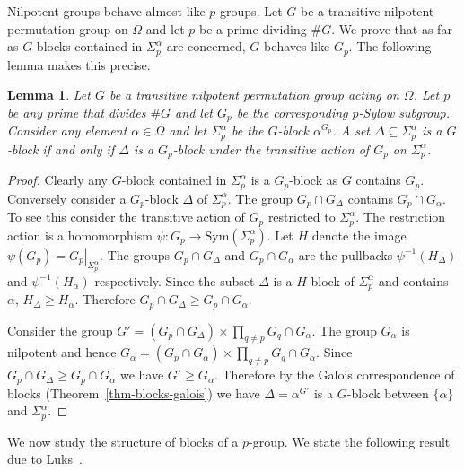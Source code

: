 \documentclass[11pt]{madras}%
\newtheorem{lemma}[theorem]{Lemma}
\theoremstyle{remark}
\newcommand{\Sym}[1]{{\ensuremath{\mathrm{Sym}\left(#1\right)}}}
\newcommand{\pr}[2]{{\ensuremath{\left.{#1}\right\vert_{#2}}}}
\begin{document}
Nilpotent groups behave almost like $p$-groups. Let $G$ be a
transitive nilpotent permutation group on $\Omega$ and let $p$ be a
prime dividing $\# G$. We prove that as far as $G$-blocks contained in
$\Sigma_p^\alpha$ are concerned, $G$ behaves like $G_p$.  The
following lemma makes this precise.

\begin{lemma}\label{lem-nilpotent-pgroup-similar}
  Let $G$ be a transitive nilpotent permutation group acting on
  $\Omega$. Let $p$ be any prime that divides $\# G$ and let $G_p$ be
  the corresponding $p$-Sylow subgroup. Consider any element $\alpha
  \in \Omega$ and let $\Sigma_p^\alpha$ be the $G$-block
  $\alpha^{G_p}$. A set $\Delta \subseteq \Sigma_p^\alpha$ is a
  $G$-block if and only if $\Delta$ is a $G_p$-block under the
  transitive action of $G_p$ on $\Sigma_p^\alpha$.
\end{lemma}
\begin{proof}
  Clearly any $G$-block contained in $\Sigma_p^\alpha$ is a
  $G_p$-block as $G$ contains $G_p$. Conversely consider a $G_p$-block
  $\Delta$ of $\Sigma_p^\alpha$.  The group $G_p \cap G_\Delta$
  contains $G_p \cap G_\alpha$. To see this consider the transitive
  action of $G_p$ restricted to $\Sigma_p^\alpha$. The restriction
  action is a homomorphism $\psi: G_p \to \Sym{\Sigma_p^\alpha}$.  Let
  $H$ denote the image $\psi(G_p) = \pr{G_p}{\Sigma_p^\alpha}$.  The
  groups $G_p \cap G_\Delta$ and $G_p \cap G_\alpha$ are the pullbacks
  $\psi^{-1}(H_\Delta)$ and $\psi^{-1}(H_\alpha)$ respectively.  Since
  the subset $\Delta$ is a $H$-block of $\Sigma_p^\alpha$ and contains
  $\alpha$, $H_\Delta \geq H_\alpha$. Therefore $G_p \cap G_\Delta
  \geq G_p \cap G_\alpha$.

  Consider the group $G' = (G_p \cap G_\Delta) \times \prod_{q \neq
    p}G_q \cap G_\alpha$. The group $G_\alpha$ is nilpotent and hence
  $G_\alpha = (G_p \cap G_\alpha) \times \prod_{q \neq p} G_q \cap
  G_\alpha$. Since $G_p \cap G_\Delta \geq G_p \cap G_\alpha$ we have
  $G' \geq G_\alpha$. Therefore by the Galois correspondence of blocks
  (Theorem~\ref{thm-blocks-galois}) we have $\Delta = \alpha^{G'}$ is
  a $G$-block between $\{ \alpha \}$ and $\Sigma_p^\alpha$.
\end{proof}

We now study the structure of blocks of a $p$-group. We state the
following result due to Luks~\cite[Lemma 1.1]{luks82bounded}.
\end{document}
